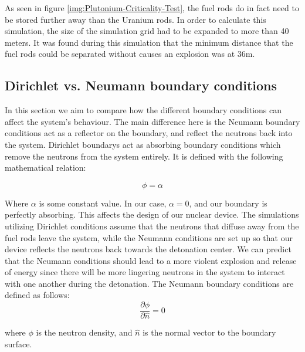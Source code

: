 \documentclass[letterpaper, 12pt]{article}
\begin{document}
         As seen in figure \ref{img:Plutonium-Criticality-Test}, the fuel rods do in fact need to be stored further away than the Uranium rods. In order to calculate this simulation, the size of the simulation grid had to be expanded to more than 40 meters. It was found during this simulation that the minimum distance that the fuel rods could be separated without causes an explosion was at 36m.


      \subsection{Dirichlet vs. Neumann boundary conditions}
         In this section we aim to compare how the different boundary conditions can affect the system's behaviour. The main difference here is the Neumann boundary conditions act as a reflector on the boundary, and reflect the neutrons back into the system. Dirichlet boundarys act as absorbing boundary conditions which remove the neutrons from the system entirely. It is defined with the following mathematical relation:

         \begin{equation}
            \phi = \alpha
         \end{equation}
      
         Where $\alpha$ is some constant value. In our case, $\alpha = 0$, and our boundary is perfectly absorbing.
         This affects the design of our nuclear device. The simulations utilizing Dirichlet conditions assume that the neutrons that diffuse away from the fuel rods leave the system, while the Neumann conditions are set up so that our device reflects the neutrons back towards the detonation center. We can predict that the Neumann conditions should lead to a more violent explosion and release of energy since there will be more lingering neutrons in the system to interact with one another during the detonation. The Neumann boundary conditions are defined as follows:
         \begin{equation}
            \frac{\partial \phi}{\partial \hat{n}} = 0 
         \end{equation}

         where $\phi$ is the neutron density, and $\hat{n}$ is the normal vector to the boundary surface.\\
\end{document}

